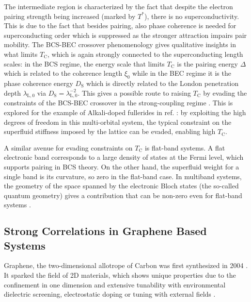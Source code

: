 \documentclass[../main.tex]{subfiles}
\begin{document}
The intermediate region is characterized by the fact that despite the electron pairing strength being increased (marked by \(T^*\)), there is no superconductivity.
This is due to the fact that besides pairing, also phase coherence is needed for superconducting order which is suppressed as the stronger attraction impairs pair mobility.
The BCS-BEC crossover phenomenology gives qualitative insights in what limits \(T_{\mathrm{C}}\), which is again strongly connected to the superconducting length scales: in the BCS regime, the energy scale that limits \(T_{\mathrm{C}}\) is the pairing energy \(\Delta\) which is related to the coherence length \(\xi_0\) while in the BEC regime it is the phase coherence energy \(D_{\mathrm{S}}\) which is directly related to the London penetration depth \(\lambda_{\mathrm{L}, 0}\) via \(D_{\mathrm{S}} = \lambda_{\mathrm{L}, 0}^{-2}\).
This gives a possible route to raising \(T_{\mathrm{C}}\) by evading the constraints of the BCS-BEC crossover in the strong-coupling regime \cite{emeryImportancePhaseFluctuations1995, kivelsonMakingHighTc2002}.
This is explored for the example of Alkali-doped fullerides in ref. \cite{wittBypassingLatticeBCS2024}: by exploiting the high degrees of freedom in this multi-orbital system, the typical constraint on the superfluid stiffness imposed by the lattice can be evaded, enabling high \(T_{\mathrm{C}}\).

A similar avenue for evading constraints on \(T_{\mathrm{C}}\) is flat-band systems.
A flat electronic band corresponds to a large density of states at the Fermi level, which supports pairing in BCS theory.
On the other hand, the superfluid weight for a single band is its curvature, so zero in the flat-band case.
In multiband systems, the geometry of the space spanned by the electronic Bloch states (the so-called quantum geometry) gives a contribution that can be non-zero even for flat-band systems \cite{peottaSuperfluidityTopologicallyNontrivial2015, penttilaFlatbandRatioQuantum2025}.

\subsection*{Strong Correlations in Graphene Based Systems}

Graphene, the two-dimensional allotrope of Carbon was first synthesized in 2004 \cite{novoselovElectricFieldEffect2004}.
It sparked the field of 2D materials, which shows unique properties due to the confinement in one dimension and extensive tunability with environmental dielectric screening, electrostatic doping or tuning with external fields \cite{geimVanWaalsHeterostructures2013}.
\end{document}
